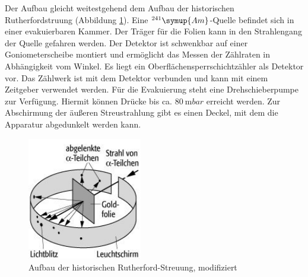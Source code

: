 Der Aufbau gleicht weitestgehend dem Aufbau der historischen Rutherfordstruung (Abbildung \ref{fig:aufbau}).
Eine $^{241}\symup{Am}$-Quelle befindet sich in einer evakuierbaren Kammer.
Der Träger für die Folien kann in den Strahlengang der Quelle gefahren werden.
Der Detektor ist schwenkbar auf einer Goniometerscheibe montiert und ermöglicht das Messen der Zählraten in Abhängigkeit vom Winkel.
Es liegt ein Oberflächensperrschichtzähler als Detektor vor.
Das Zählwerk ist mit dem Detektor verbunden und kann mit einem Zeitgeber verwendet werden.
Für die Evakuierung steht eine Drehschieberpumpe zur Verfügung.
Hiermit können Drücke bis ca. $\SI{80}{\milli bar}$ erreicht werden.
Zur Abschirmung der äußeren Streustrahlung gibt es einen Deckel, mit dem die Apparatur abgedunkelt werden kann.

\begin{figure}[h!]
  \centering
  \includegraphics[width=5cm]{images/aufbau_rutherfordstreuung.jpg}
  \caption{Aufbau der historischen Rutherford-Streuung, modifiziert \cite{aufbau}}
  \label{fig:aufbau}
\end{figure}

%
%
